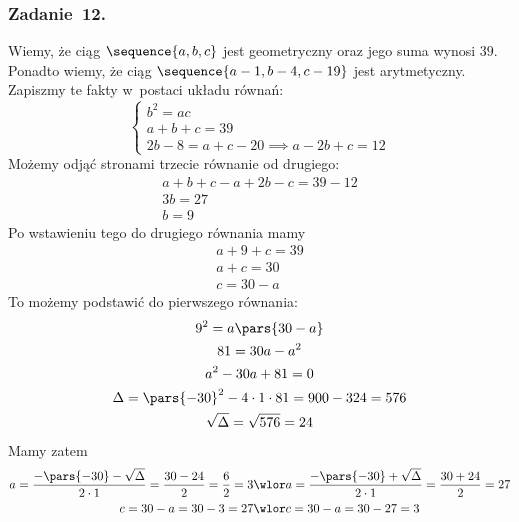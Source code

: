 \subsubsection*{Zadanie~12.}
Wiemy, że ciąg \(\sequence{a, b, c}\) jest geometryczny oraz jego suma wynosi \(39\). Ponadto wiemy, że ciąg \(\sequence{a - 1, b - 4, c - 19}\) jest arytmetyczny. Zapiszmy te fakty w~postaci układu równań:
\begin{equation*}
    \begin{cases}
        b^2 = ac\\
        a + b + c = 39\\
        2b - 8 = a + c - 20 \implies a - 2b + c = 12
    \end{cases}
\end{equation*}
Możemy odjąć stronami trzecie równanie od drugiego:
\begin{gather*}
    a + b + c - a + 2b - c = 39 - 12\\
    3b = 27\\
    b = 9
\end{gather*}
Po wstawieniu tego do drugiego równania mamy
\begin{gather*}
    a + 9 + c = 39\\
    a + c = 30\\
    c = 30 - a
\end{gather*}
To możemy podstawić do pierwszego równania:
\begin{gather*}
    9^2 = a\pars{30 - a}\\
    81 = 30a - a^2\\
    a^2 - 30a + 81 = 0\\
    \Delta = \pars{-30}^2 - 4 \cdot 1 \cdot 81 = 900 - 324 = 576\\
    \sqrt{\Delta} = \sqrt{576} = 24
\end{gather*}
Mamy zatem
\begin{align*}
    a = \frac{-\pars{-30} - \sqrt{\Delta}}{2 \cdot 1} = \frac{30 - 24}{2} = \frac{6}{2} = 3
    &\wlor
    a = \frac{-\pars{-30} + \sqrt{\Delta}}{2 \cdot 1} = \frac{30 + 24}{2} = 27\\
    c = 30 - a = 30 - 3 = 27
    &\wlor
    c = 30 - a = 30 - 27 = 3
\end{align*}
